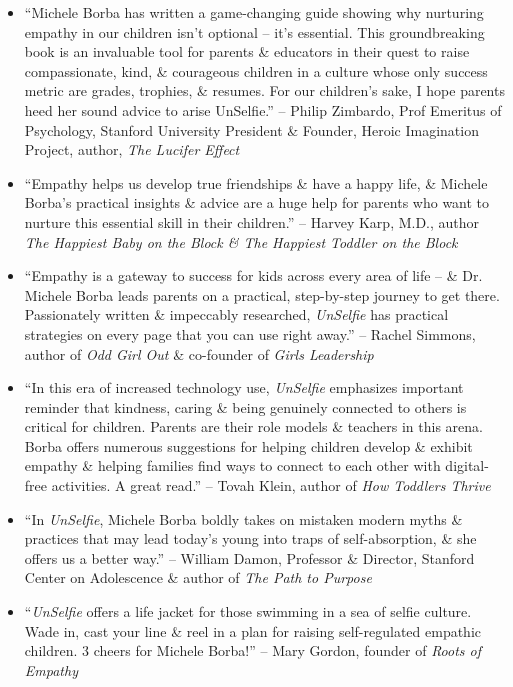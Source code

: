 \documentclass{article}
\begin{document}
\begin{enumerate}
\begin{itemize}
		\item ``{\sc Michele Borba} has written a game-changing guide showing why nurturing empathy in our children isn't optional -- it's essential. This groundbreaking book is an invaluable tool for parents \& educators in their quest to raise compassionate, kind, \& courageous children in a culture whose only success metric are grades, trophies, \& resumes. For our children's sake, I hope parents heed her sound advice to arise UnSelfie.'' -- {\sc Philip Zimbardo}, Prof Emeritus of Psychology, Stanford University President \& Founder, Heroic Imagination Project, author, {\it The Lucifer Effect}
		\item ``Empathy helps us develop true friendships \& have a happy life, \& {\sc Michele Borba}'s practical insights \& advice are a huge help for parents who want to nurture this essential skill in their children.'' -- {\sc Harvey Karp}, M.D., author {\it The Happiest Baby on the Block \& The Happiest Toddler on the Block}
		\item ``Empathy is a gateway to success for kids across every area of life -- \& Dr. {\sc Michele Borba} leads parents on a practical, step-by-step journey to get there. Passionately written \& impeccably researched, {\it UnSelfie} has practical strategies on every page that you can use right away.'' -- {\sc Rachel Simmons}, author of {\it Odd Girl Out} \& co-founder of {\it Girls Leadership}
		\item ``In this era of increased technology use, {\it UnSelfie} emphasizes important reminder that kindness, caring \& being genuinely connected to others is critical for children. Parents are their role models \& teachers in this arena. {\sc Borba} offers numerous suggestions for helping children develop \& exhibit empathy \& helping families find ways to connect to each other with digital-free activities. A great read.'' -- {\sc Tovah Klein}, author of {\it How Toddlers Thrive}
		\item ``In {\it UnSelfie}, {\sc Michele Borba} boldly takes on mistaken modern myths \& practices that may lead today's young into traps of self-absorption, \& she offers us a better way.'' -- {\sc William Damon}, Professor \& Director, Stanford Center on Adolescence \& author of {\it The Path to Purpose}
		\item ``{\it UnSelfie} offers a life jacket for those swimming in a sea of selfie culture. Wade in, cast your line \& reel in a plan for raising self-regulated empathic children. 3 cheers for {\sc Michele Borba}!'' -- {\sc Mary Gordon}, founder of {\it Roots of Empathy}

\end{itemize}
\end{enumerate}
\end{document}
